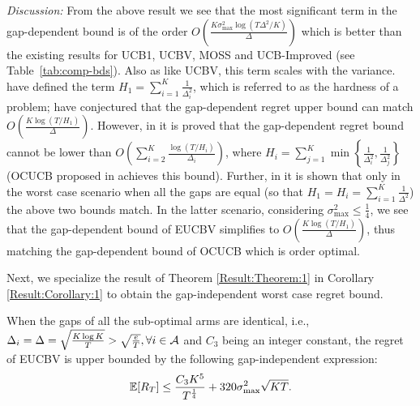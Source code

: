 \emph{Discussion:} From the above result we see that the most significant term in the gap-dependent bound is of the order $O\left(\frac{K\sigma^2_{\max}\log{(T\Delta^{2}/K)}}{\Delta}\right)$ which is better than the existing results for UCB1, UCBV, MOSS and UCB-Improved (see Table~\ref{tab:comp-bds}). Also as like UCBV, this term scales with the variance. \citet{audibert2010best} have defined the term $H_1=\sum_{i=1}^{K}\frac{1}{\Delta_i^2}$, which is referred to as the hardness of a problem; \citet{bubeck2012regret} have conjectured that the gap-dependent regret upper bound can match $O\left(\frac{K\log{(T/H_1)}}{\Delta}\right)$. However, in  \citet{lattimore2015optimally} it is proved that the gap-dependent regret bound cannot be lower than $O\left(\sum_{i=2}^{K}\frac{\log\left(T/H_i\right)}{\Delta_i}\right)$, where $H_i=\sum_{j=1}^{K}\min\left\lbrace \frac{1}{\Delta_i^2},\frac{1}{\Delta_j^2}\right\rbrace$ (OCUCB proposed in \citet{lattimore2015optimally} achieves this bound). Further, in \citet{lattimore2015optimally} it is shown that only in the worst case scenario when all the gaps are equal (so that $H_1=H_{i}=\sum_{i=1}^{K}\frac{1}{\Delta^2}$) the above two bounds match. In the latter scenario, considering $\sigma^2_{\max}\leq \frac{1}{4}$, we see that the gap-dependent bound of EUCBV simplifies to $O\left(\frac{K\log{(T/H_1)}}{\Delta}\right)$, thus matching the gap-dependent bound of OCUCB which is order optimal.

Next, we specialize the result of Theorem \ref{Result:Theorem:1} in Corollary \ref{Result:Corollary:1} to  obtain the gap-independent worst case regret bound. %



\begin{corollary}
\label{Result:Corollary:1}
When the gaps of all the sub-optimal arms are identical, i.e., $\Delta_i =\Delta = \sqrt{\frac{K\log K}{T}}>\sqrt{\frac{e}{T}}, \forall i\in \mathcal{A}$ and $C_3$ being an integer constant, the
regret of EUCBV is upper bounded by the following gap-independent expression:
\begin{align*}
	\mathbb{E}[R_{T}]\leq  \dfrac{C_3 K^5}{T^{\frac{1}{4}}} + 320\sigma_{\max}^2\sqrt{KT}.
\end{align*}	
\end{corollary}
	
